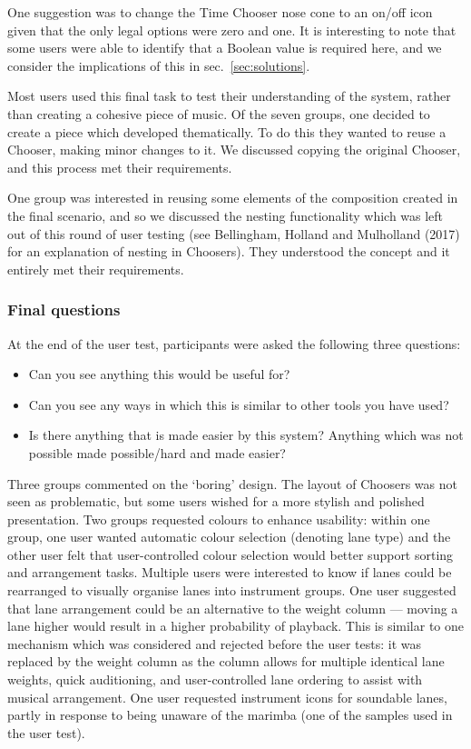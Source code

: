 \documentclass{ppig}
\begin{document}
One suggestion was to change the Time Chooser nose cone to an on/off
icon given that the only legal options were zero and one. It is
interesting to note that some users were able to identify that a Boolean
value is required here, and we consider the implications of this in
sec.~\ref{sec:solutions}.

Most users used this final task to test their understanding of the
system, rather than creating a cohesive piece of music. Of the seven
groups, one decided to create a piece which developed thematically. To
do this they wanted to reuse a Chooser, making minor changes to it. We
discussed copying the original Chooser, and this process met their
requirements.

One group was interested in reusing some elements of the composition
created in the final scenario, and so we discussed the nesting
functionality which was left out of this round of user testing (see
Bellingham, Holland and Mulholland (2017) for an explanation of nesting
in Choosers). They understood the concept and it entirely met their
requirements.

\hypertarget{final-questions}{%
\subsubsection{Final questions}\label{final-questions}}

At the end of the user test, participants were asked the following three
questions:

\begin{itemize}
\item
  Can you see anything this would be useful for?
\item
  Can you see any ways in which this is similar to other tools you have
  used?
\item
  Is there anything that is made easier by this system? Anything which
  was not possible made possible/hard and made easier?
\end{itemize}

Three groups commented on the `boring' design. The layout of Choosers
was not seen as problematic, but some users wished for a more stylish
and polished presentation. Two groups requested colours to enhance
usability: within one group, one user wanted automatic colour selection
(denoting lane type) and the other user felt that user-controlled colour
selection would better support sorting and arrangement tasks. Multiple
users were interested to know if lanes could be rearranged to visually
organise lanes into instrument groups. One user suggested that lane
arrangement could be an alternative to the weight column --- moving a
lane higher would result in a higher probability of playback. This is
similar to one mechanism which was considered and rejected before the
user tests: it was replaced by the weight column as the column allows
for multiple identical lane weights, quick auditioning, and
user-controlled lane ordering to assist with musical arrangement. One
user requested instrument icons for soundable lanes, partly in response
to being unaware of the marimba (one of the samples used in the user
test).
\end{document}
